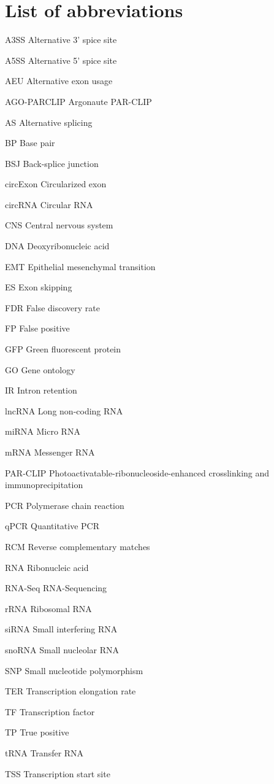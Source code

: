 \chapter{List of abbreviations}
\begin{abbreviations}
\item[A3SS] Alternative 3' spice site
\item[A5SS] Alternative 5' spice site
\item[AEU] Alternative exon usage
\item[AGO-PARCLIP] Argonaute PAR-CLIP
\item[AS] Alternative splicing
\item[BP] Base pair
\item[BSJ] Back-splice junction
\item[circExon] Circularized exon
\item[circRNA] Circular RNA
\item[CNS] Central nervous system
\item[DNA] Deoxyribonucleic acid
\item[EMT] Epithelial mesenchymal transition
\item[ES] Exon skipping
\item[FDR] False discovery rate
\item[FP] False positive
\item[GFP] Green fluorescent protein
\item[GO] Gene ontology
\item[IR] Intron retention
\item[lncRNA] Long non-coding RNA
\item[miRNA] Micro RNA
\item[mRNA] Messenger RNA
\item[PAR-CLIP] Photoactivatable-ribonucleoside-enhanced crosslinking and immunoprecipitation
\item[PCR] Polymerase chain reaction
\item[qPCR] Quantitative PCR
\item[RCM] Reverse complementary matches
\item[RNA] Ribonucleic acid
\item[RNA-Seq] RNA-Sequencing
\item[rRNA] Ribosomal RNA
\item[siRNA] Small interfering RNA
\item[snoRNA] Small nucleolar RNA
\item[SNP] Small nucleotide polymorphism
\item[TER] Transcription elongation rate
\item[TF] Transcription factor
\item[TP] True positive
\item[tRNA] Transfer RNA
\item[TSS] Transcription start site

\end{abbreviations}